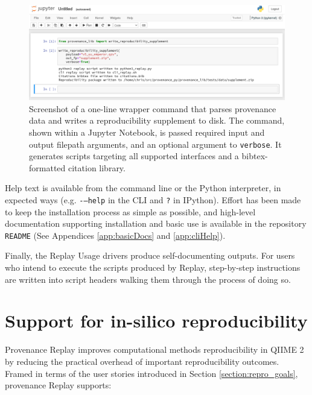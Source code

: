 \begin{figure}[htp]
\centering
\includegraphics[width=\textwidth]{figures/supplement_replay_jn.png}
\caption[Screenshot of a simple Python 3 replay command]%
{Screenshot of a one-line wrapper command that parses provenance data and
writes a reproducibility supplement to disk. The command, shown within a
Jupyter Notebook, is passed required input and output filepath arguments, and
an optional argument to \texttt{verbose}. It generates scripts targeting all
supported interfaces and a bibtex-formatted citation library.}
\label{fig:simple_py_command}
\end{figure}

Help text is available from the command line or the Python interpreter, in
expected ways (e.g. \texttt{-–help} in the CLI and \texttt{?} in IPython).
Effort has been made to keep the installation process as simple as possible, and
high-level documentation supporting installation and basic use is available in
the repository \texttt{README} (See Appendices \ref{app:basicDocs} and
\ref{app:cliHelp}).

Finally, the Replay Usage drivers produce self-documenting outputs. For users
who intend to execute the scripts produced by Replay, step-by-step instructions
are written into script headers walking them through the process of doing so.


\section{Support for in-silico reproducibility}

Provenance Replay improves computational methods reproducibility in QIIME 2 by
reducing the practical overhead of important reproducibility outcomes. Framed in
terms of the user stories introduced in Section \ref{section:repro_goals},
provenance Replay supports:

